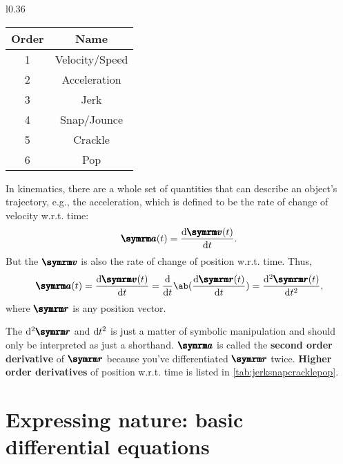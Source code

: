 \begin{wraptable}[14]{l}{0.36\textwidth}
    \begin{tabular}{c | c}
        Order & Name \\
        \hline
        1 & Velocity/Speed \\
        2 & Acceleration \\
        3 & Jerk \\
        4 & Snap/Jounce \\
        5 & Crackle \\
        6 & Pop
    \end{tabular}
    \caption{Higher order derivatives of position w.r.t. time}
    \label{tab:jerksnapcracklepop}
\end{wraptable}
In kinematics, there are a whole set of quantities that can describe an object's trajectory, e.g., the acceleration, which is defined to be the rate of change of velocity w.r.t. time:
\begin{equation*}
    \vv{a}(t) = \odv{\vv{v}(t)}{t}.
\end{equation*}
But the $\vv{v}$ is also the rate of change of position w.r.t. time. Thus,
\begin{equation*}
    \vv{a}(t) = \odv{\vv{v}(t)}{t} = \odv*{\ab(\odv{\vv{r}(t)}{t})}{t} = \odv[ord = 2]{\vv{r}(t)}{t}, 
\end{equation*}
where $\vv{r}$ is any position vector.

The $\odif[ord = 2]{\vv{r}}$ and $\odif{t}^2$ is just a matter of symbolic manipulation and should only be interpreted as just a shorthand. $\vv{a}$ is called the \textbf{second order derivative} of $\vv{r}$ because you've differentiated $\vv{r}$ twice. \textbf{Higher order derivatives} of position w.r.t. time is listed in \cref{tab:jerksnapcracklepop}.

\section{Expressing nature: basic differential equations}
\label{sec:basicdifferentialequations}

